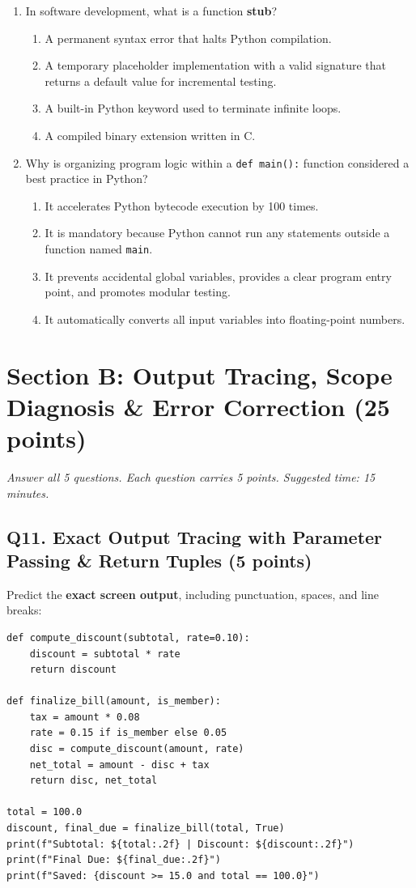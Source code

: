 \documentclass[11pt,a4paper]{article}
\begin{document}
\begin{enumerate}[label=\textbf{Q\arabic*.},leftmargin=2em,itemsep=1.5pt,topsep=1pt,resume]
\item In software development, what is a function \textbf{stub}?
\begin{enumerate}[label=\Alph*.,leftmargin=2em]
  \item A permanent syntax error that halts Python compilation.
  \item A temporary placeholder implementation with a valid signature that returns a default value for incremental testing.
  \item A built-in Python keyword used to terminate infinite loops.
  \item A compiled binary extension written in C.
\end{enumerate}

\item Why is organizing program logic within a \texttt{def main():} function considered a best practice in Python?
\begin{enumerate}[label=\Alph*.,leftmargin=2em]
  \item It accelerates Python bytecode execution by 100 times.
  \item It is mandatory because Python cannot run any statements outside a function named \texttt{main}.
  \item It prevents accidental global variables, provides a clear program entry point, and promotes modular testing.
  \item It automatically converts all input variables into floating-point numbers.
\end{enumerate}

\end{enumerate}

\section*{Section B: Output Tracing, Scope Diagnosis \& Error Correction \hfill \normalsize\normalfont(25 points)}
\textit{Answer all 5 questions. Each question carries 5 points. Suggested time: 15 minutes.}

\subsection*{Q11. Exact Output Tracing with Parameter Passing \& Return Tuples (5 points)}
Predict the \textbf{exact screen output}, including punctuation, spaces, and line breaks:

\begin{lstlisting}
def compute_discount(subtotal, rate=0.10):
    discount = subtotal * rate
    return discount

def finalize_bill(amount, is_member):
    tax = amount * 0.08
    rate = 0.15 if is_member else 0.05
    disc = compute_discount(amount, rate)
    net_total = amount - disc + tax
    return disc, net_total

total = 100.0
discount, final_due = finalize_bill(total, True)
print(f"Subtotal: ${total:.2f} | Discount: ${discount:.2f}")
print(f"Final Due: ${final_due:.2f}")
print(f"Saved: {discount >= 15.0 and total == 100.0}")
\end{lstlisting}
\end{document}
